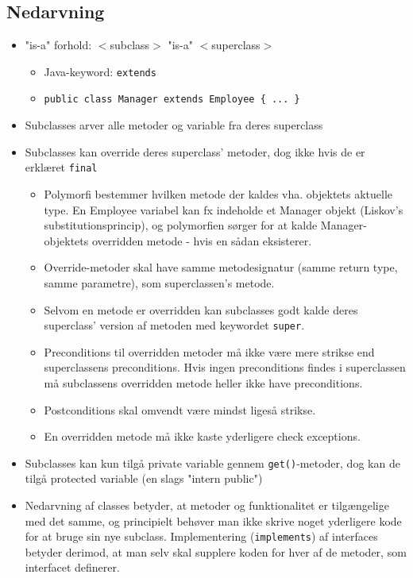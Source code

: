 \subsection{Nedarvning}

\begin{itemize}
  \item "is-a" forhold: $<$subclass$>$ "is-a" $<$superclass$>$
  \begin{itemize}
    \item Java-keyword: \verb|extends|
    \item \verb|public class Manager extends Employee { ... }|
  \end{itemize}
  
  \item Subclasses arver alle metoder og variable fra deres superclass
  \item Subclasses kan override deres superclass' metoder, dog ikke hvis de er erklæret \verb|final|
  \begin{itemize}
    \item Polymorfi bestemmer hvilken metode der kaldes vha. objektets aktuelle type. En Employee variabel kan fx indeholde et Manager objekt (Liskov's substitutionsprincip), og polymorfien sørger for at kalde Manager-objektets overridden metode - hvis en sådan eksisterer.
    \item Override-metoder skal have samme metodesignatur (samme return type, samme parametre), som superclassen's metode.
    \item Selvom en metode er overridden kan subclasses godt kalde deres superclass' version af metoden med keywordet \verb|super|.
    \item Preconditions til overridden metoder må ikke være mere strikse end superclassens preconditions. Hvis ingen preconditions findes i superclassen må subclassens overridden metode heller ikke have preconditions.
    \item Postconditions skal omvendt være mindst ligeså strikse.
    \item En overridden metode må ikke kaste yderligere check exceptions.
  \end{itemize}
  
  \item Subclasses kan kun tilgå private variable gennem \verb|get()|-metoder, dog kan de tilgå protected variable (en slags "intern public")
  \item Nedarvning af classes betyder, at metoder og funktionalitet er tilgængelige med det samme, og principielt behøver man ikke skrive noget yderligere kode for at bruge sin nye subclass. Implementering (\verb|implements|) af interfaces betyder derimod, at man selv skal supplere koden for hver af de metoder, som interfacet definerer.
\end{itemize}

